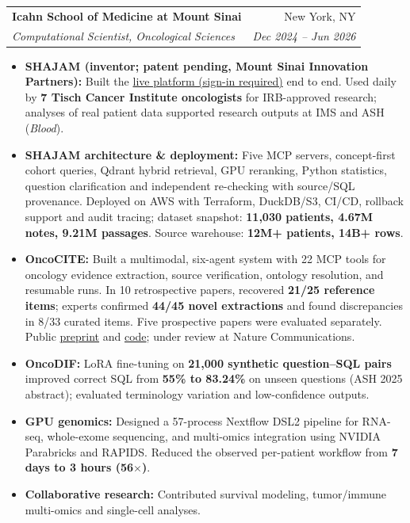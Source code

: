 \documentclass[letterpaper,11pt]{article}
\makeatletter
\newcommand{\entry}[4]{%
  \begin{tabularx}{\textwidth}{@{}X r@{}}
    \textbf{#1} & #2 \\
    \textit{#3} & \textit{#4} \\
  \end{tabularx}\vspace{-3pt}}
\newenvironment{bullets}{\begin{itemize}[leftmargin=12pt,itemsep=2pt,parsep=0pt,topsep=1.5pt]}{\end{itemize}\vspace{3pt}}
\newcommand{\lead}[1]{\textbf{#1}}
\makeatother
\begin{document}
\entry{Icahn School of Medicine at Mount Sinai}{New York, NY}{Computational Scientist, Oncological Sciences}{Dec 2024 -- Jun 2026}
\begin{bullets}
  \item \lead{SHAJAM (inventor; patent pending, Mount Sinai Innovation Partners):} Built the
  \href{https://shajam-mm.com/}{live platform (sign-in required)} end to end. Used daily by \textbf{7 Tisch Cancer Institute oncologists}
  for IRB-approved research; analyses of real patient data supported research outputs at IMS and ASH (\textit{Blood}).
  \item \lead{SHAJAM architecture \& deployment:} Five MCP servers, concept-first cohort queries, Qdrant hybrid retrieval,
  GPU reranking, Python statistics, question clarification and independent re-checking with source/SQL provenance.
  Deployed on AWS with Terraform, DuckDB/S3, CI/CD, rollback support and audit tracing; dataset snapshot:
  \textbf{11,030 patients, 4.67M notes, 9.21M passages}. Source warehouse: \textbf{12M+ patients, 14B+ rows}.
  \item \lead{OncoCITE:} Built a multimodal, six-agent system with 22 MCP tools for oncology evidence extraction, source
  verification, ontology resolution, and resumable runs. In 10 retrospective papers, recovered \textbf{21/25 reference items};
  experts confirmed \textbf{44/45 novel extractions} and found discrepancies in 8/33 curated items. Five prospective papers
  were evaluated separately. Public \href{https://doi.org/10.21203/rs.3.rs-9160944/v1}{preprint} and
  \href{https://github.com/Ali-Maq/civic-extraction-agent}{code}; under review at Nature Communications.
  \item \lead{OncoDIF:} LoRA fine-tuning on \textbf{21,000 synthetic question--SQL pairs} improved correct SQL from
  \textbf{55\% to 83.24\%} on unseen questions (ASH 2025 abstract); evaluated terminology variation and low-confidence outputs.
  \item \lead{GPU genomics:} Designed a 57-process Nextflow DSL2 pipeline for RNA-seq, whole-exome sequencing, and multi-omics
  integration using NVIDIA Parabricks and RAPIDS. Reduced the observed per-patient workflow from \textbf{7 days to 3 hours (56$\times$)}.
  \item \lead{Collaborative research:} Contributed survival modeling, tumor/immune multi-omics and single-cell analyses.
\end{bullets}
\end{document}
